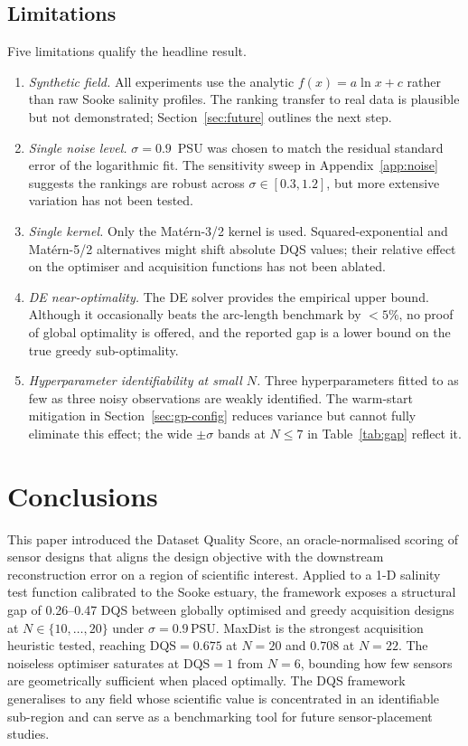 \documentclass[11pt,letterpaper]{article}
\begin{document}
\subsection{Limitations}
Five limitations qualify the headline result.
\begin{enumerate}[itemsep=2pt,topsep=2pt]
  \item \emph{Synthetic field.} All experiments use the analytic
        $f(x)=a\ln x + c$ rather than raw Sooke salinity profiles. The
        ranking transfer to real data is plausible but not
        demonstrated; Section~\ref{sec:future} outlines the next step.
  \item \emph{Single noise level.} $\sigma=0.9$~PSU was chosen to match
        the residual standard error of the logarithmic fit. The
        sensitivity sweep in Appendix~\ref{app:noise} suggests the
        rankings are robust across $\sigma\in[0.3,1.2]$, but more
        extensive variation has not been tested.
  \item \emph{Single kernel.} Only the Mat\'ern-3/2 kernel is used.
        Squared-exponential and Mat\'ern-5/2 alternatives might shift
        absolute DQS values; their relative effect on the optimiser
        and acquisition functions has not been ablated.
  \item \emph{DE near-optimality.} The DE solver provides the
        empirical upper bound. Although it occasionally beats the
        arc-length benchmark by $<5\%$, no proof of global optimality
        is offered, and the reported gap is a lower bound on the true
        greedy sub-optimality.
  \item \emph{Hyperparameter identifiability at small $N$.} Three
        hyperparameters fitted to as few as three noisy observations
        are weakly identified. The warm-start mitigation in
        Section~\ref{sec:gp-config} reduces variance but cannot fully
        eliminate this effect; the wide $\pm\sigma$ bands at $N\le 7$
        in Table~\ref{tab:gap} reflect it.
\end{enumerate}

\section{Conclusions}
\label{sec:conclusions}
This paper introduced the Dataset Quality Score, an oracle-normalised
scoring of sensor designs that aligns the design objective with the
downstream reconstruction error on a region of scientific interest.
Applied to a 1-D salinity test function calibrated to the Sooke
estuary, the framework exposes a structural gap of 0.26--0.47 DQS
between globally optimised and greedy acquisition designs at
$N\in\{10,\dots,20\}$ under $\sigma=0.9\,\mathrm{PSU}$. MaxDist is the
strongest acquisition heuristic tested, reaching $\mathrm{DQS}=0.675$
at $N=20$ and $0.708$ at $N=22$. The noiseless optimiser saturates at
$\mathrm{DQS}=1$ from $N=6$, bounding how few sensors are
geometrically sufficient when placed optimally. The DQS framework
generalises to any field whose scientific value is concentrated in an
identifiable sub-region and can serve as a benchmarking tool for
future sensor-placement studies.
\end{document}
